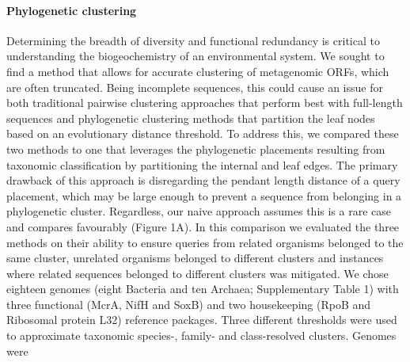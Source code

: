 \documentclass[10pt,letterpaper]{article}
\begin{document}
\paragraph{Phylogenetic clustering}

Determining the breadth of diversity and functional redundancy is critical to understanding the biogeochemistry of an environmental system. We sought to find a method that allows for accurate clustering of metagenomic ORFs, which are often truncated. Being incomplete sequences, this could cause an issue for both traditional pairwise clustering approaches that perform best with full-length sequences and phylogenetic clustering methods that partition the leaf nodes based on an evolutionary distance threshold. To address this, we compared these two methods to one that leverages the phylogenetic placements resulting from taxonomic classification by partitioning the internal and leaf edges. The primary drawback of this approach is disregarding the pendant length distance of a query placement, which may be large enough to prevent a sequence from belonging in a phylogenetic cluster. Regardless, our naive approach assumes this is a rare case and compares favourably (Figure 1A). 
In this comparison we evaluated the three methods on their ability to ensure queries from related organisms belonged to the same cluster, unrelated organisms belonged to different clusters and instances where related sequences belonged to different clusters was mitigated.
We chose eighteen genomes (eight Bacteria and ten Archaea; Supplementary Table 1) with three functional (McrA, NifH and SoxB) and two housekeeping (RpoB and Ribosomal protein L32) reference packages. Three different thresholds were used to approximate taxonomic species-, family- and class-resolved clusters. Genomes were 

\end{document}
